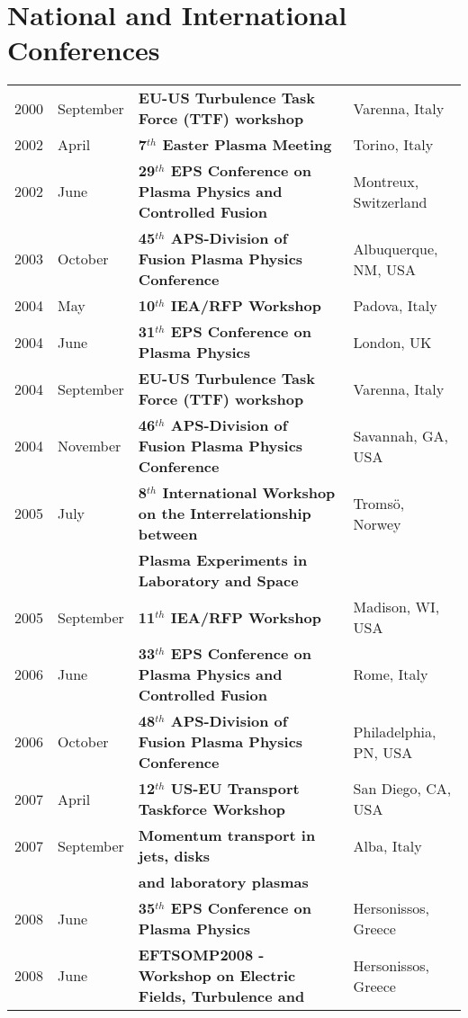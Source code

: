 \section{National and International Conferences}
\begin{longtable}{llll}
2000 & September & \textbf{EU-US Turbulence Task Force (TTF) workshop}
& Varenna, Italy \\
2002 & April & \textbf{7$^{th}$ Easter Plasma Meeting}& Torino, Italy
\\
2002 & June & \textbf{29$^{th}$ EPS Conference on Plasma Physics and
  Controlled Fusion} & Montreux, Switzerland \\
2003 & October & \textbf{45$^{th}$ APS-Division of Fusion Plasma
  Physics Conference}& Albuquerque, NM, USA \\
2004 & May & \textbf{10$^{th}$ IEA/RFP Workshop}& Padova, Italy \\
2004 & June & \textbf{31$^{th}$ EPS Conference on Plasma Physics} &
London, UK \\
2004 & September & \textbf{EU-US Turbulence Task Force (TTF) workshop}
& Varenna, Italy \\
2004 & November & \textbf{46$^{th}$ APS-Division of Fusion Plasma
  Physics Conference} & Savannah, GA, USA \\
2005 & July & \textbf{8$^{th}$ International Workshop on the
  Interrelationship between} & Troms\"o, Norwey \\
 & & \textbf{Plasma Experiments in Laboratory and
  Space} & \\
2005 & September & \textbf{11$^{th}$ IEA/RFP Workshop} & Madison, WI,
USA \\
2006 & June & \textbf{33$^{th}$ EPS Conference on Plasma Physics and
  Controlled Fusion} & Rome, Italy \\
2006 & October & \textbf{48$^{th}$ APS-Division of Fusion Plasma
  Physics Conference} & Philadelphia, PN, USA \\
2007 & April & \textbf{12$^{th}$ US-EU Transport Taskforce Workshop} &
San Diego, CA, USA \\
2007 & September & \textbf{Momentum transport in jets, disks} & Alba,
Italy \\
& & \textbf{ and laboratory plasmas} & \\
2008 & June & \textbf{35$^{th}$ EPS Conference on Plasma Physics} &
Hersonissos, Greece \\
2008 & June & \textbf{EFTSOMP2008 - Workshop on Electric Fields, Turbulence
                 and} & Hersonissos, Greece \\

\end{longtable}
